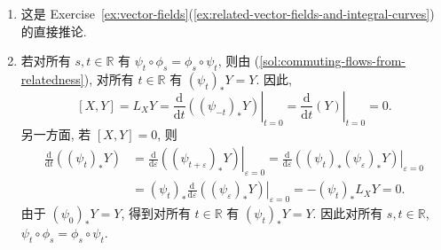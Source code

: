 \begin{description}[font=\normalfont,leftmargin=2em,labelwidth=1.5em]
\begin{enumerate}[label=(\alph*),ref=\alph*,leftmargin=*]
\item\label{sol:commuting-flows-from-relatedness} 这是 Exercise~\ref{ex:vector-fields}(\ref{ex:related-vector-fields-and-integral-curves}) 的直接推论.
\item 若对所有 $s,t\in\mathbb{R}$ 有 $\psi_t\circ\phi_s=\phi_s\circ\psi_t$, 则由 (\ref{sol:commuting-flows-from-relatedness}), 对所有 $t\in\mathbb{R}$ 有 $(\psi_t)_*Y=Y$. 因此,
\[
  [X,Y]=L_XY=\left.\frac{\mathrm{d}}{\mathrm{d}t}((\psi_{-t})_*Y)\right|_{t=0}
  =\left.\frac{\mathrm{d}}{\mathrm{d}t}(Y)\right|_{t=0}=0.
\]
另一方面, 若 $[X,Y]=0$, 则
\begin{align*}
  \frac{\mathrm{d}}{\mathrm{d}t}((\psi_t)_*Y)
  &=\left.\frac{\mathrm{d}}{\mathrm{d}\varepsilon}((\psi_{t+\varepsilon})_*Y)\right|_{\varepsilon=0}
  =\left.\frac{\mathrm{d}}{\mathrm{d}\varepsilon}((\psi_t)_*(\psi_\varepsilon)_*Y)\right|_{\varepsilon=0}\\
  &=(\psi_t)_*\left.\frac{\mathrm{d}}{\mathrm{d}\varepsilon}((\psi_\varepsilon)_*Y)\right|_{\varepsilon=0}
  =-(\psi_t)_*L_XY=0.
\end{align*}
由于 $(\psi_0)_*Y=Y$, 得到对所有 $t\in\mathbb{R}$ 有 $(\psi_t)_*Y=Y$. 因此对所有 $s,t\in\mathbb{R}$, $\psi_t\circ\phi_s=\phi_s\circ\psi_t$.
\end{enumerate}
\end{description}
